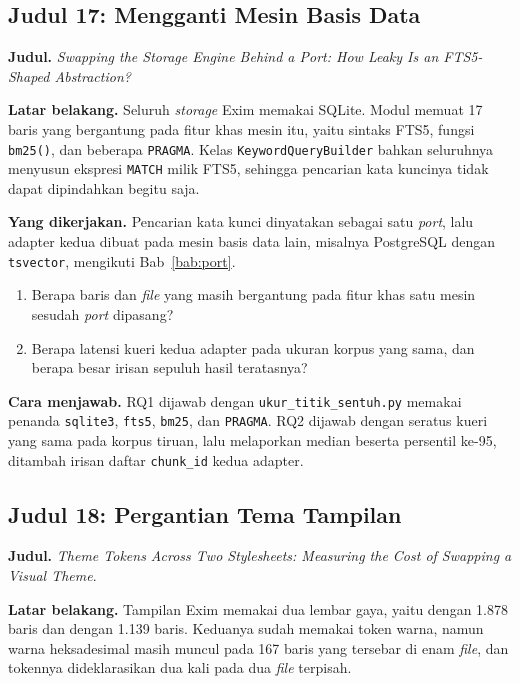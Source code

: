 \subsection*{Judul 17: Mengganti Mesin Basis Data}

\textbf{Judul.} \textit{Swapping the Storage Engine Behind a Port: How Leaky
Is an FTS5-Shaped Abstraction?}

\textbf{Latar belakang.} Seluruh \textit{storage} Exim memakai SQLite. Modul
 memuat 17 baris yang bergantung pada fitur khas mesin
itu, yaitu sintaks FTS5, fungsi \texttt{bm25()}, dan beberapa \texttt{PRAGMA}.
Kelas \texttt{KeywordQueryBuilder} bahkan seluruhnya menyusun ekspresi
\texttt{MATCH} milik FTS5, sehingga pencarian kata kuncinya tidak dapat
dipindahkan begitu saja.

\textbf{Yang dikerjakan.} Pencarian kata kunci dinyatakan sebagai satu
\textit{port}, lalu adapter kedua dibuat pada mesin basis data lain, misalnya
PostgreSQL dengan \texttt{tsvector}, mengikuti Bab~\ref{bab:port}.

\begin{enumerate}
  \item Berapa baris dan \textit{file} yang masih bergantung pada fitur khas satu
    mesin sesudah \textit{port} dipasang?
  \item Berapa latensi kueri kedua adapter pada ukuran korpus yang sama, dan
    berapa besar irisan sepuluh hasil teratasnya?
\end{enumerate}

\textbf{Cara menjawab.} RQ1 dijawab dengan \texttt{ukur\_titik\_sentuh.py}
memakai penanda \texttt{sqlite3}, \texttt{fts5}, \texttt{bm25}, dan
\texttt{PRAGMA}. RQ2 dijawab dengan seratus kueri yang sama pada korpus
tiruan, lalu melaporkan median beserta persentil ke-95, ditambah irisan daftar
\texttt{chunk\_id} kedua adapter.

\subsection*{Judul 18: Pergantian Tema Tampilan}

\textbf{Judul.} \textit{Theme Tokens Across Two Stylesheets: Measuring the
Cost of Swapping a Visual Theme}.

\textbf{Latar belakang.} Tampilan Exim memakai dua lembar gaya, yaitu
 dengan 1.878 baris dan  dengan
1.139 baris. Keduanya sudah memakai token warna, namun warna heksadesimal masih
muncul pada 167 baris yang tersebar di enam \textit{file}, dan tokennya dideklarasikan
dua kali pada dua \textit{file} terpisah.

